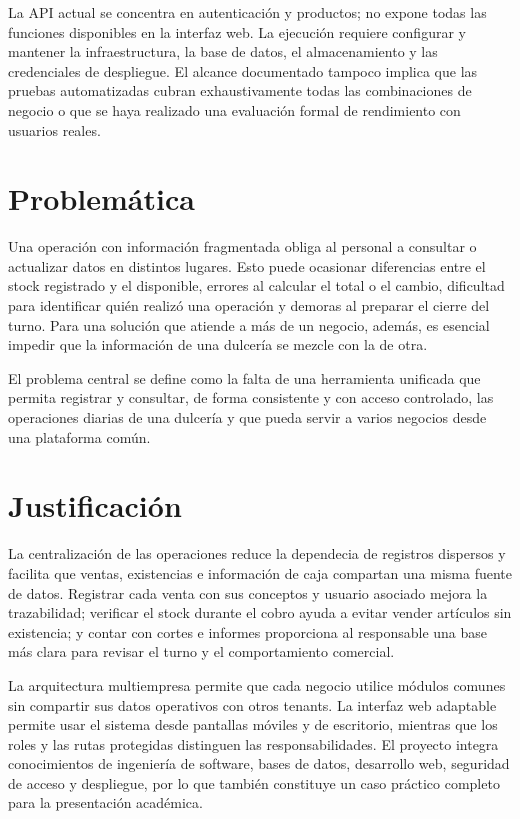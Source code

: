 La API actual se concentra en autenticación y productos; no expone todas las funciones disponibles en la interfaz web. La ejecución requiere configurar y mantener la infraestructura, la base de datos, el almacenamiento y las credenciales de despliegue. El alcance documentado tampoco implica que las pruebas automatizadas cubran exhaustivamente todas las combinaciones de negocio o que se haya realizado una evaluación formal de rendimiento con usuarios reales.

\section{Problemática}

Una operación con información fragmentada obliga al personal a consultar o actualizar datos en distintos lugares. Esto puede ocasionar diferencias entre el stock registrado y el disponible, errores al calcular el total o el cambio, dificultad para identificar quién realizó una operación y demoras al preparar el cierre del turno. Para una solución que atiende a más de un negocio, además, es esencial impedir que la información de una dulcería se mezcle con la de otra.

El problema central se define como la falta de una herramienta unificada que permita registrar y consultar, de forma consistente y con acceso controlado, las operaciones diarias de una dulcería y que pueda servir a varios negocios desde una plataforma común.

\section{Justificación}

La centralización de las operaciones reduce la dependecia de registros dispersos y facilita que ventas, existencias e información de caja compartan una misma fuente de datos. Registrar cada venta con sus conceptos y usuario asociado mejora la trazabilidad; verificar el stock durante el cobro ayuda a evitar vender artículos sin existencia; y contar con cortes e informes proporciona al responsable una base más clara para revisar el turno y el comportamiento comercial.

La arquitectura multiempresa permite que cada negocio utilice módulos comunes sin compartir sus datos operativos con otros tenants. La interfaz web adaptable permite usar el sistema desde pantallas móviles y de escritorio, mientras que los roles y las rutas protegidas distinguen las responsabilidades. El proyecto integra conocimientos de ingeniería de software, bases de datos, desarrollo web, seguridad de acceso y despliegue, por lo que también constituye un caso práctico completo para la presentación académica.